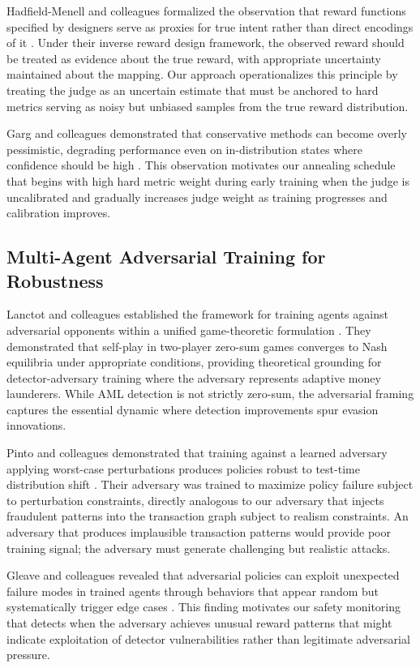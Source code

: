 \documentclass[11pt,a4paper]{article}
\begin{document}
Hadfield-Menell and colleagues formalized the observation that reward functions specified by designers serve as proxies for true intent rather than direct encodings of it \citep{hadfield2017inverse}. Under their inverse reward design framework, the observed reward should be treated as evidence about the true reward, with appropriate uncertainty maintained about the mapping. Our approach operationalizes this principle by treating the judge as an uncertain estimate that must be anchored to hard metrics serving as noisy but unbiased samples from the true reward distribution.

Garg and colleagues demonstrated that conservative methods can become overly pessimistic, degrading performance even on in-distribution states where confidence should be high \citep{garg2023extreme}. This observation motivates our annealing schedule that begins with high hard metric weight during early training when the judge is uncalibrated and gradually increases judge weight as training progresses and calibration improves.

\subsection{Multi-Agent Adversarial Training for Robustness}

Lanctot and colleagues established the framework for training agents against adversarial opponents within a unified game-theoretic formulation \citep{lanctot2017unified}. They demonstrated that self-play in two-player zero-sum games converges to Nash equilibria under appropriate conditions, providing theoretical grounding for detector-adversary training where the adversary represents adaptive money launderers. While AML detection is not strictly zero-sum, the adversarial framing captures the essential dynamic where detection improvements spur evasion innovations.

Pinto and colleagues demonstrated that training against a learned adversary applying worst-case perturbations produces policies robust to test-time distribution shift \citep{pinto2017robust}. Their adversary was trained to maximize policy failure subject to perturbation constraints, directly analogous to our adversary that injects fraudulent patterns into the transaction graph subject to realism constraints. An adversary that produces implausible transaction patterns would provide poor training signal; the adversary must generate challenging but realistic attacks.

Gleave and colleagues revealed that adversarial policies can exploit unexpected failure modes in trained agents through behaviors that appear random but systematically trigger edge cases \citep{gleave2020adversarial}. This finding motivates our safety monitoring that detects when the adversary achieves unusual reward patterns that might indicate exploitation of detector vulnerabilities rather than legitimate adversarial pressure.
\end{document}
